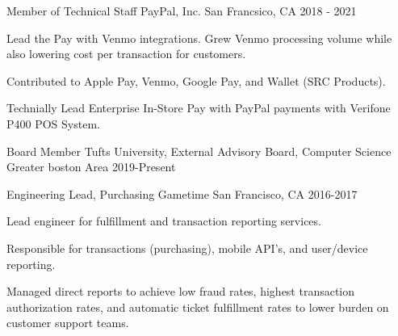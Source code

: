 
\begin{cventries}

  \cventry
    {Member of Technical Staff} %
    {PayPal, Inc.} %
    {San Francsico, CA} %
    {2018 - 2021} %
    {
      \begin{cvitems} %
        \item {Lead the Pay with Venmo integrations. Grew Venmo processing volume while also lowering cost per transaction for customers.}
        \item {Contributed to Apple Pay, Venmo, Google Pay, and Wallet (SRC Products).}
        \item {Technially Lead Enterprise In-Store Pay with PayPal payments with Verifone P400 POS System.}
      \end{cvitems}
    }

  \cventry
    {Board Member} %
    {Tufts University, External Advisory Board, Computer Science} %
    {Greater boston Area} %
    {2019-Present} %
    {
      \begin{cvitems} %
      \end{cvitems}
    }

  \cventry
    {Engineering Lead, Purchasing} %
    {Gametime} %
    {San Francisco, CA} %
    {2016-2017} %
    {
      \begin{cvitems} %
        \item {Lead engineer for fulfillment and transaction reporting services.}
        \item {Responsible for transactions (purchasing), mobile API's, and user/device reporting.}
        \item {Managed direct reports to achieve low fraud rates, highest transaction authorization rates, and automatic ticket fulfillment rates to lower burden on customer support teams.}
      \end{cvitems}
    }


\end{cventries}
